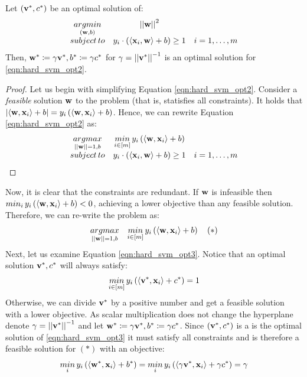 \begin{claim}
	Let $\left(\mathbf{v}^*,c^*\right)$ be an optimal solution of:
	\begin{equation}
		\begin{array}{ccc}
			\underset{\left(\mathbf{w},b\right)}{argmin} & \left|\left| \mathbf{w}\right|\right|^2 & \\
			subject \, to & y_i \cdot \left( \left\langle \mathbf{x}_i,\mathbf{w}\right\rangle+b \right) \geq 1 & i=1,\ldots,m\\
		\end{array}
		\label{eqn:hard_svm_opt3}
	\end{equation}
	Then, $\mathbf{w}^*\coloneqq\gamma\mathbf{v}^*,b^*\coloneqq\gamma c^*$ for $\gamma=\left|\left| \mathbf{v}^*\right|\right|^{-1}$ is an optimal solution for \ref{eqn:hard_svm_opt2}.
\end{claim}
\begin{proof}
	Let us begin with simplifying Equation \ref{eqn:hard_svm_opt2}. Consider a \textit{feasible} solution $\mathbf{w}$ to the problem (that is, statisfies all constraints). It holds that $\left|\left\langle \mathbf{w},\mathbf{x}_i\right\rangle+b\right|=y_i\left(\left\langle \mathbf{w},\mathbf{x}_i\right\rangle+b\right)$. Hence, we can rewrite Equation \ref{eqn:hard_svm_opt2} as:
	$$
	\begin{array}{ccc}
		\underset{\left|\left| \mathbf{w}\right|\right|=1,b}{argmax} & \underset{i\in\left[m\right]}{min}\,y_i\left(\left\langle \mathbf{w},\mathbf{x}_i\right\rangle+b\right) & \\
		subject \, to & y_i \cdot \left( \left\langle \mathbf{x}_i,\mathbf{w}\right\rangle+b \right) \geq 1 & i=1,\ldots,m\\
	\end{array}
	\label{eqn:hard_svm_opt2}
	$$
\end{proof}
Now, it is clear that the constraints are redundant. If $\mathbf{w}$ is infeasible then $min_i\,y_i\left(\left\langle \mathbf{w},\mathbf{x}_i\right\rangle+b\right)< 0$, achieving a lower objective than any feasible solution. Therefore, we can re-write the problem as:
$$ \underset{\left|\left| \mathbf{w}\right|\right|=1,b}{argmax} \quad \underset{i\in\left[m\right]}{min}\,y_i\left(\left\langle \mathbf{w},\mathbf{x}_i\right\rangle+b\right)\quad\left(\mathbf{*}\right) $$
Next, let us examine Equation \ref{eqn:hard_svm_opt3}. Notice that an optimal solution $\mathbf{v}^*,c^*$ will always satisfy: $$\underset{i\in\left[m\right]}{min}\,y_i\left(\left\langle \mathbf{v}^*,\mathbf{x}_i\right\rangle+c^*\right)=1$$
Otherwise, we can divide $\mathbf{v}^*$ by a positive number and get a feasible solution with a lower objective. As scalar multiplication does not change the hyperplane denote $\gamma=\left|\left| \mathbf{v}^*\right|\right|^{-1}$ and let $\mathbf{w}^*\coloneqq\gamma\mathbf{v}^*, b^*\coloneqq\gamma c^*$. Since $\left(\mathbf{v}^*,c^*\right)$ is a is the optimal solution of \ref{eqn:hard_svm_opt3} it must satisfy all constraints and is therefore a feasible solution for  $\left(\mathbf{*}\right)$ with an objective: $$\underset{i}{min}\, y_i\left(\left\langle \mathbf{w}^*,\mathbf{x}_i\right\rangle+b^*\right) = \underset{i}{min}\, y_i\left(\left\langle \gamma \mathbf{v}^*,\mathbf{x}_i\right\rangle+\gamma c^*\right) = \gamma$$

